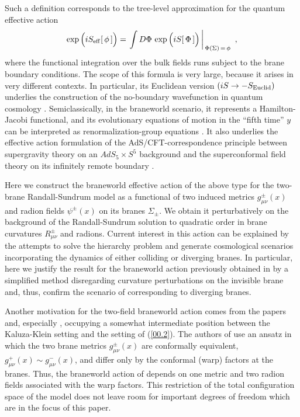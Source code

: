 \documentclass[a4paper,preprint,nofootinbib,
                 showpacs,preprintnumbers,amsmath,amssymb]{revtex4}
\begin{document}
Such a definition corresponds to the tree-level approximation for 
the quantum effective action 
    \begin{equation} 
    \exp\Big(iS_{\rm eff}[\,\phi\,]\Big)= 
    \left.\int D\Phi \,\exp\Big(iS[\,\Phi\,]\Big)\, 
    \right|_{\,\Phi(\Sigma)\,=\,\phi}\,\, ,         \label{00.2} 
    \end{equation} 
where the functional integration over the bulk fields runs subject to 
the brane boundary conditions. The scope of this formula is very 
large, because it arises in very different contexts. In 
particular, its Euclidean version $(iS\to -S_{\rm Euclid})$ 
underlies the construction of the no-boundary wavefunction in 
quantum cosmology \cite{HH}. Semiclassically, in the braneworld 
scenario, it represents a Hamilton-Jacobi functional, and its 
evolutionary equations of motion in the ``fifth time'' $y$ can be 
interpreted as renormalization-group equations \cite{Verlinde}. 
It also underlies the effective action formulation of the 
AdS/CFT-correspondence principle between supergravity theory 
on an $AdS_5\times S^5$ background and the superconformal field 
theory on its infinitely remote boundary 
\cite{AdS/CFT,GKR,HHR1,HHR2,SkendSol}. 
 
Here we construct the braneworld effective action of the above 
type for the two-brane Randall-Sundrum model as a functional of 
two induced metrics $g_{\mu\nu}^\pm(x)$ and radion fields 
$\psi^\pm(x)$ on its branes $\Sigma_\pm$. We obtain it 
perturbatively on the background of the Randall-Sundrum solution 
to quadratic order in brane curvatures $R^\pm_{\mu\nu}$ and 
radions. Current interest in this action can be explained by the 
attempts to solve the hierarchy problem and generate 
cosmological scenarios incorporating the dynamics of either 
colliding \cite{DvTyeSh,Ekpyr,brantibr,cycle} or diverging 
\cite{brane} branes. In particular, here we justify the result for 
the braneworld action previously obtained in \cite{brane} by 
a simplified method disregarding curvature perturbations on the 
invisible brane and, thus, confirm the scenario of \cite{brane}  
corresponding to diverging branes. 
 
Another motivation for the two-field braneworld action comes from 
the papers \cite{GarSas} and, especially \cite{GarPujTan}, 
occupying a somewhat intermediate position between the 
Kaluza-Klein setting and the setting of (\ref{00.2}). The authors 
of \cite{GarSas,GarPujTan} use an ansatz in which the two brane 
metrics $g_{\mu\nu}^\pm(x)$ are conformally equivalent, 
$g_{\mu\nu}^+(x)\sim g_{\mu\nu}^-(x)$, and differ only by the 
conformal (warp) factors at the branes. Thus, the braneworld 
action of \cite{GarPujTan} depends on one metric and two radion 
fields associated with the warp factors. This restriction of the 
total configuration space of the model does not leave room for 
important degrees of freedom which are in the focus of this paper. 
 
\end{document}
